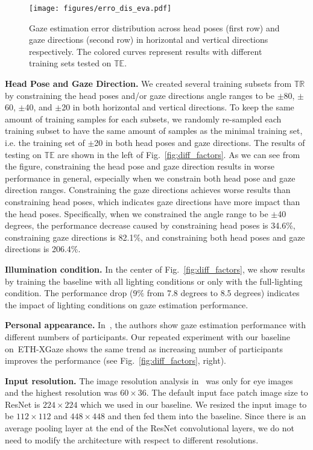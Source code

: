 \documentclass[runningheads]{llncs}
\newcommand{\datasetname}{ETH-XGaze\xspace}
\begin{document}
\begin{figure}[t]
    \centering
    \texttt{[image: figures/erro\_dis\_eva.pdf]}
    \caption{Gaze estimation error distribution across head poses (first row) and gaze directions (second row) in horizontal and vertical directions respectively. The colored curves represent results with different training sets tested on $\mathbb{TE}$.}
    \label{fig:error_dis_eva}
\end{figure}

\textbf{Head Pose and Gaze Direction.} We created several training subsets from $\mathbb{TR}$ by constraining the head poses and/or gaze directions angle ranges to be $\pm$80, $\pm$60, $\pm$40, and $\pm$20 in both horizontal and vertical directions.
To keep the same amount of training samples for each subsets, we randomly re-sampled each training subset to have the same amount of samples as the minimal training set, i.e. the training set of $\pm$20 in both head poses and gaze directions.
The results of testing on $\mathbb{TE}$ are shown in the left of Fig.~\ref{fig:diff_factors}.
As we can see from the figure, constraining the head pose and gaze direction results in worse performance in general, especially when we constrain both head pose and gaze direction ranges.
Constraining the gaze directions achieves worse results than constraining head poses, which indicates gaze directions have more impact than the head poses.
Specifically, when we constrained the angle range to be $\pm$40 degrees, the performance decrease caused by constraining head poses is 34.6\%, constraining gaze directions is 82.1\%, and constraining both head poses and gaze directions is 206.4\%.


\textbf{Illumination condition.} In the center of Fig.~\ref{fig:diff_factors}, we show results by training the baseline with all lighting conditions or only with the full-lighting condition.
The performance drop ($9\%$ from 7.8 degrees to 8.5 degrees) indicates the impact of lighting conditions on gaze estimation performance.

\textbf{Personal appearance.} In~\cite{krafka2016eye}, the authors show gaze estimation performance with different numbers of participants.
Our repeated experiment with our baseline on~\datasetname shows the same trend as increasing number of participants improves the performance (see Fig.~\ref{fig:diff_factors}, right).

\textbf{Input resolution.} 
The image resolution analysis in~\cite{zhang2019mpiigaze} was only for eye images and the highest resolution was $60\times36$.
The default input face patch image size to ResNet is $224\times224$ which we used in our baseline.
We resized the input image to be $112\times112$ and $448\times448$ and then fed them into the baseline.
Since there is an average pooling layer at the end of the ResNet convolutional layers, we do not need to modify the architecture with respect to different resolutions.
\end{document}
